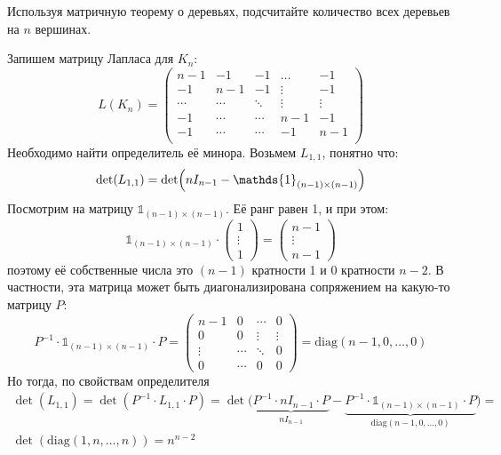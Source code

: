 \documentclass[a4paper,12pt,twoside]{article}
\begin{document}
\begin{?}
    Используя матричную теорему о деревьях, подсчитайте количество всех деревьев на $n$ вершинах.
\end{?}
\begin{solution}{}
    Запишем матрицу Лапласа для $K_n$:
    \[
        L(K_{n}) = \begin{pmatrix}
            n - 1  &   - 1  &   - 1  & \ldots &  - 1   \\
              - 1  & n - 1  &   - 1  & \vdots &  - 1   \\
            \cdots & \cdots & \ddots & \vdots & \vdots \\
              -1   & \cdots & \cdots &  n - 1 &   -1   \\
              -1   & \cdots & \cdots &    - 1 &  n - 1 \\
        \end{pmatrix}
    \]
    Необходимо найти определитель её минора. Возьмем $L_{1, 1}$, понятно что:
    \[
        \det(L_{1, 1}) = \det\mleft(nI_{n - 1} - \mathds{1}_{(n - 1) \times (n - 1)}\mright)
    \]
    Посмотрим на матрицу $\mathds{1}_{(n - 1) \times (n - 1)}$. Её ранг равен 1, и при этом:
    \[
        \mathds{1}_{(n - 1) \times (n - 1)} \cdot \begin{pmatrix}
            1 \\ \vdots \\ 1
        \end{pmatrix} = \begin{pmatrix}
            n - 1 \\ \vdots \\ n - 1
        \end{pmatrix} 
    \]
    поэтому её собственные числа это $(n - 1)$ кратности 1 и $0$ кратности $n - 2$. В частности, эта матрица может быть диагонализирована сопряжением на какую-то матрицу $P$:
    \[
        P^{-1} \cdot \mathds{1}_{(n - 1) \times (n - 1)} \cdot P = \begin{pmatrix}
            n - 1  & 0      & \cdots & 0 \\
              0    & 0      & \vdots & \vdots \\
            \vdots & \cdots & \ddots &  0  \\
              0    & \cdots &   0    &  0
        \end{pmatrix} = \mathrm{diag}(n-1, 0, \ldots, 0)
    \]
    Но тогда, по свойствам определителя
    \begin{multline*}
        \det(L_{1, 1}) = \det(P^{-1} \cdot L_{1, 1} \cdot P) =  \det\big(\underbrace{P^{-1} \cdot nI_{n - 1} \cdot P}_{ nI_{n - 1} } - \underbrace{P^{-1} \cdot \mathds{1}_{(n - 1) \times (n - 1)} \cdot P}_{\mathrm{diag}(n-1, 0, \ldots, 0)}\big) = \\ \det(\mathrm{diag}(1, n, \ldots, n)) = n^{n-2}
    \end{multline*}
\end{solution}
\end{document}
